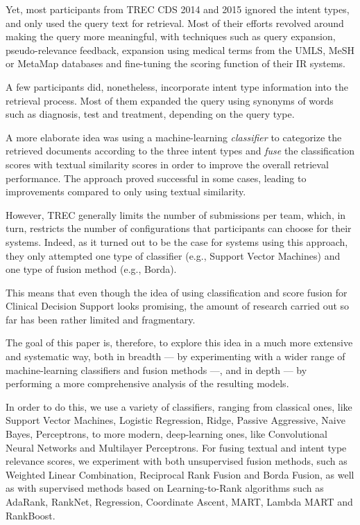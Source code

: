Yet, most participants from TREC CDS 2014 and 2015 ignored the intent types,
and only used the query text for retrieval.
Most of their efforts revolved around making the query more meaningful, with techniques
such as query expansion, pseudo-relevance feedback, expansion using medical terms from the UMLS, MeSH or MetaMap databases and
fine-tuning the scoring function of their IR systems.

A few participants did, nonetheless, incorporate intent type information into the retrieval process. Most of them
 expanded the query using synonyms of words such as diagnosis, test and treatment, depending on the query type.

A more elaborate idea was using a machine-learning \emph{classifier} to categorize the retrieved documents according
to the three intent types and \emph{fuse} the classification scores
with textual similarity scores in order to improve the overall retrieval performance.
The approach proved successful in some cases, leading to improvements compared to only using textual similarity.

However, TREC generally limits the number of submissions per team, which, in turn, restricts
the number of configurations that participants can choose for their systems.
Indeed, as it turned out to be the case for systems using this approach,
they only attempted one type of classifier (e.g., Support Vector Machines)
and one type of fusion method (e.g., Borda).

This means that even though the idea of using classification and score fusion
for Clinical Decision Support looks promising,
the amount of research carried out so far has been rather limited and fragmentary.

The goal of this paper is, therefore, to
explore this idea in a much more extensive and systematic way, both in breadth --- by experimenting
with a wider range of machine-learning classifiers and fusion methods ---,
and in depth --- by performing a more comprehensive analysis of the resulting models.

In order to do this, we use a variety of classifiers, ranging from classical ones, like Support Vector Machines,
Logistic Regression, Ridge, Passive Aggressive, Naive Bayes, Perceptrons,
to more modern, deep-learning ones, like Convolutional Neural Networks and Multilayer Perceptrons.
For fusing textual and intent type relevance scores,
we experiment with both unsupervised fusion methods, such as Weighted Linear Combination, Reciprocal Rank Fusion and Borda Fusion,
as well as with supervised methods based
on Learning-to-Rank algorithms such as AdaRank, RankNet, Regression, Coordinate Ascent, MART, Lambda MART and RankBoost.

